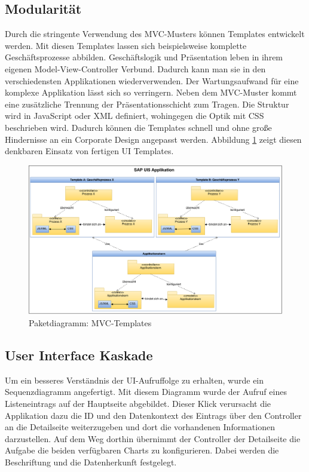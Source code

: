 \newpage
\subsection{Modularität}
Durch die stringente Verwendung des MVC-Musters können Templates entwickelt werden. Mit diesen Templates lassen sich beispielsweise komplette Geschäftsprozesse abbilden. Geschäftslogik und Präsentation leben in ihrem eigenen Model-View-Controller Verbund. Dadurch kann man sie in den verschiedensten Applikationen wiederverwenden. Der Wartungsaufwand für eine komplexe Applikation lässt sich so verringern. Neben dem MVC-Muster kommt eine zusätzliche Trennung der Präsentationsschicht zum Tragen. Die Struktur wird in JavaScript oder XML definiert, wohingegen die Optik mit CSS beschrieben wird. Dadurch können die Templates schnell und ohne große Hindernisse an ein Corporate Design angepasst werden. Abbildung \ref{fig:sapui5mvctemplates} zeigt diesen denkbaren Einsatz von fertigen UI Templates.

\vspace{1em}
\begin{figure}[htb]
  \centering
  \includegraphics[width=1\linewidth,angle=90]{abb/sapui5_mvc_templates}
  \caption[Paketdiagramm: MVC-Templates]{Paketdiagramm: MVC-Templates}
  \label{fig:sapui5mvctemplates}
\end{figure}

\newpage
\subsection{User Interface Kaskade}
Um ein besseres Verständnis der UI-Aufruffolge zu erhalten, wurde ein Sequenzdiagramm angefertigt. Mit diesem Diagramm wurde der Aufruf eines Listeneintrags auf der Hauptseite abgebildet. Dieser Klick verursacht die Applikation dazu die ID und den Datenkontext des Eintrags über den Controller an die Detailseite weiterzugeben und dort die vorhandenen Informationen darzustellen. Auf dem Weg dorthin übernimmt der Controller der Detailseite die Aufgabe die beiden verfügbaren Charts zu konfigurieren. Dabei werden die Beschriftung und die Datenherkunft festgelegt.

